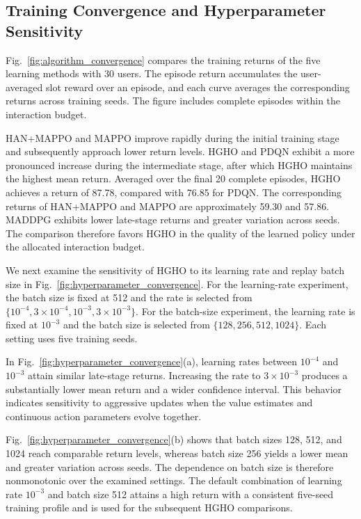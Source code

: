 \documentclass[journal]{IEEEtran}
\begin{document}
\subsection{Training Convergence and Hyperparameter Sensitivity}
\label{subsec:training_performance}

Fig.~\ref{fig:algorithm_convergence} compares the training
returns of the five learning methods with 30 users.
The episode return accumulates the user-averaged slot
reward over an episode, and each curve averages the
corresponding returns across training seeds.
The figure includes complete episodes within the
interaction budget.

HAN+MAPPO and MAPPO improve rapidly during the initial
training stage and subsequently approach lower return
levels. HGHO and PDQN exhibit a more pronounced
increase during the intermediate stage, after which
HGHO maintains the highest mean return.
Averaged over the final 20 complete episodes,
HGHO achieves a return of 87.78, compared with
76.85 for PDQN. The corresponding returns of HAN+MAPPO
and MAPPO are approximately 59.30 and 57.86.
MADDPG exhibits lower late-stage returns and greater
variation across seeds.
The comparison therefore favors HGHO in the
quality of the learned policy under the allocated
interaction budget.

We next examine the sensitivity of HGHO to its
learning rate and replay batch size in
Fig.~\ref{fig:hyperparameter_convergence}.
For the learning-rate experiment, the batch size is
fixed at 512 and the rate is selected from
$\{10^{-4},3\times10^{-4},10^{-3},3\times10^{-3}\}$.
For the batch-size experiment, the learning rate is
fixed at $10^{-3}$ and the batch size is selected from
$\{128,256,512,1024\}$.
Each setting uses five training seeds.

In Fig.~\ref{fig:hyperparameter_convergence}(a), learning
rates between $10^{-4}$ and $10^{-3}$ attain similar
late-stage returns. Increasing the rate to
$3\times10^{-3}$ produces a substantially lower mean
return and a wider confidence interval.
This behavior indicates sensitivity to aggressive
updates when the value estimates and continuous
action parameters evolve together.

Fig.~\ref{fig:hyperparameter_convergence}(b) shows that
batch sizes 128, 512, and 1024 reach comparable return
levels, whereas batch size 256 yields a lower mean
and greater variation across seeds.
The dependence on batch size is therefore nonmonotonic
over the examined settings.
The default combination of learning rate $10^{-3}$
and batch size 512 attains a high return with a
consistent five-seed training profile and is used
for the subsequent HGHO comparisons.
\end{document}
